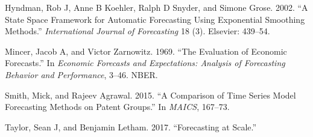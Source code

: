 \documentclass[12pt,preprint, authoryear]{elsarticle}
\numberwithin{equation}{section}
\numberwithin{figure}{section}
\numberwithin{table}{section}
\begin{document}
\hypertarget{ref-hyndman2002state}{}
Hyndman, Rob J, Anne B Koehler, Ralph D Snyder, and Simone Grose. 2002.
``A State Space Framework for Automatic Forecasting Using Exponential
Smoothing Methods.'' \emph{International Journal of Forecasting} 18 (3).
Elsevier: 439--54.

\hypertarget{ref-mincer1969evaluation}{}
Mincer, Jacob A, and Victor Zarnowitz. 1969. ``The Evaluation of
Economic Forecasts.'' In \emph{Economic Forecasts and Expectations:
Analysis of Forecasting Behavior and Performance}, 3--46. NBER.

\hypertarget{ref-smith2015comparison}{}
Smith, Mick, and Rajeev Agrawal. 2015. ``A Comparison of Time Series
Model Forecasting Methods on Patent Groups.'' In \emph{MAICS}, 167--73.

\hypertarget{ref-taylor2017forecasting}{}
Taylor, Sean J, and Benjamin Letham. 2017. ``Forecasting at Scale.''

\newpage
\nocite{*}

\end{document}
